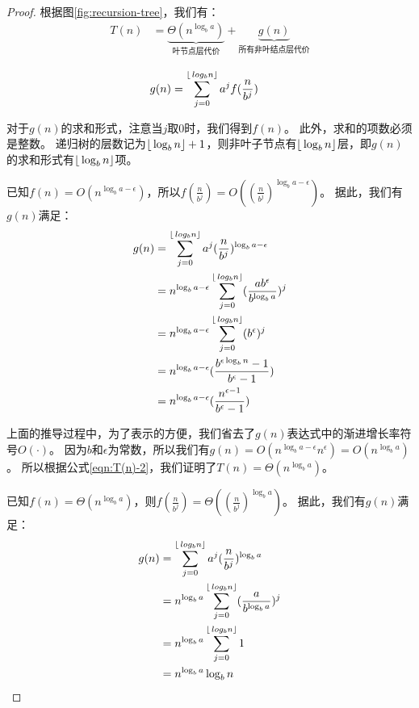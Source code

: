 \begin{proof}

根据图\ref{fig:recursion-tree}，我们有：
\begin{align} \label{eqn:T(n)-2}
    T(n) &= \underbrace{\Theta(n^{\log_b a})}_{\text{叶节点层代价}} + \underbrace{g(n)}_{\text{所有非叶结点层代价}}  
\end{align}

\begin{align}
    g(n) &= \sum_{j=0}^{\left \lfloor\,log_b n \right \rfloor} a^j f(\frac{n}{b^j}) \label{eqn:g(n)}
\end{align}

\noindent 对于$g(n)$的求和形式，注意当$j$取0时，我们得到$f(n)$。
此外，求和的项数必须是整数。
\pur
递归树的层数记为$\left \lfloor\,\log_b n \right \rfloor+1$，则非叶子节点有$\left \lfloor\,\log_b n \right \rfloor$层，即$g(n)$的求和形式有$\left \lfloor\,\log_b n \right \rfloor$项。
\bla

%
已知$f(n) = O(n^{\log_b a - \epsilon})$，所以$f(\frac{n}{b^j}) = O((\frac{n}{b^j})^{\log_b a - \epsilon})$。
据此，我们有$g(n)$满足：
\begin{align*}
    g(n) &= \sum_{j=0}^{\left \lfloor\,log_b n \right \rfloor} a^j (\frac{n}{b^j})^{\log_b a - \epsilon} \\
    &= n^{\log_b a - \epsilon} \sum_{j=0}^{\left \lfloor\,log_b n \right \rfloor} (\frac{ab^{\epsilon}}{b^{\log_b a}})^j \\
    &= n^{\log_b a - \epsilon} \sum_{j=0}^{\left \lfloor\,log_b n \right \rfloor} (b^{\epsilon})^j \\
    &= n^{\log_b a - \epsilon} (\frac{b^{\epsilon \log_b n}-1}{b^{\epsilon}-1}) \\
    &= n^{\log_b a - \epsilon} (\frac{n^{\epsilon -1}}{b^{\epsilon}-1})
\end{align*}

\noindent 上面的推导过程中，为了表示的方便，我们省去了$g(n)$表达式中的渐进增长率符号$O(\cdot)$。
因为$b$和$\epsilon$为常数，所以我们有$g(n) = O(n^{\log_b a - \epsilon} n^{\epsilon}) = O(n^{\log_b a})$。
所以根据公式\ref{eqn:T(n)-2}，我们证明了$T(n) = \Theta(n^{\log_b a})$。

%
已知$f(n) = \Theta(n^{\log_b a})$，则$f(\frac{n}{b^j}) = \Theta( (\frac{n}{b^j})^{\log_b a} )$。
据此，我们有$g(n)$满足：
\begin{align*}
    g(n) &= \sum_{j=0}^{\left \lfloor\,log_b n \right \rfloor} a^j (\frac{n}{b^j})^{\log_b a} \\
    &= n^{\log_b a} \sum_{j=0}^{\left \lfloor\,log_b n \right \rfloor} (\frac{a}{b^{\log_b a}})^j \\
    &= n^{\log_b a} \sum_{j=0}^{\left \lfloor\,log_b n \right \rfloor} 1 \\
    &= n^{\log_b a} \log_b n
\end{align*}


\end{proof}
